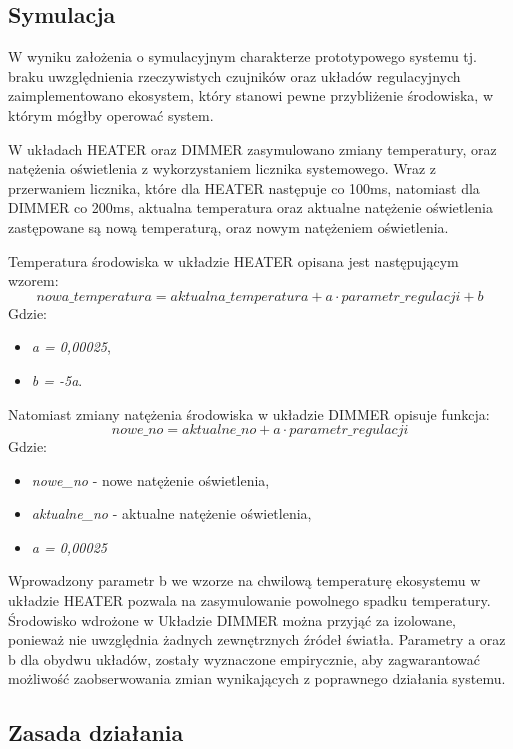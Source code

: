     \subsection{Symulacja}
    W wyniku założenia o symulacyjnym charakterze prototypowego systemu tj. braku uwzględnienia rzeczywistych czujników oraz układów regulacyjnych zaimplementowano ekosystem, który stanowi pewne przybliżenie środowiska, w którym mógłby operować system. 

    W układach HEATER oraz DIMMER zasymulowano zmiany temperatury, oraz natężenia oświetlenia z wykorzystaniem licznika systemowego. Wraz z przerwaniem licznika, które dla HEATER następuje co 100ms, natomiast dla DIMMER co 200ms, aktualna temperatura oraz aktualne natężenie oświetlenia zastępowane są nową temperaturą, oraz nowym natężeniem oświetlenia. 

    Temperatura środowiska w układzie HEATER opisana jest następującym wzorem:
        \[nowa\_temperatura = aktualna\_temperatura + a\cdot parametr\_regulacji + b\]
    Gdzie:
    \begin{itemize}
        \item \textit{a = 0,00025},
        \item \textit{b = -5a}. 
    \end{itemize}

    Natomiast zmiany natężenia środowiska w układzie DIMMER opisuje funkcja:
    \[nowe\_no= aktualne\_no + a\cdot parametr\_regulacji\]
    Gdzie:
    \begin{itemize}
        \item \textit{nowe\_no} - nowe natężenie oświetlenia,
        \item \textit{aktualne\_no} - aktualne natężenie oświetlenia,
        \item \textit{a = 0,00025}
    \end{itemize}

    Wprowadzony parametr b we wzorze na chwilową temperaturę ekosystemu w układzie HEATER pozwala na zasymulowanie powolnego spadku temperatury. Środowisko wdrożone w Układzie DIMMER można przyjąć za izolowane, ponieważ nie uwzględnia żadnych zewnętrznych źródeł światła.
    Parametry a oraz b dla obydwu układów, zostały wyznaczone empirycznie, aby zagwarantować możliwość zaobserwowania zmian wynikających z poprawnego działania systemu.
    
    \subsection{Zasada działania}
    \label{subsec:system-behaviour}

